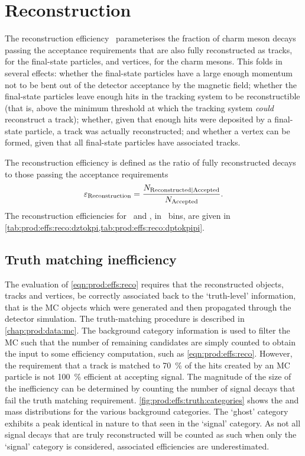 \section{Reconstruction}
\label{chap:prod:effs:reco}

The reconstruction efficiency \effreco\ parameterises the fraction of charm
meson decays passing the acceptance requirements that are also fully
reconstructed as tracks, for the final-state particles, and vertices, for the
charm mesons.
This folds in several effects: whether the final-state particles have a large
enough momentum not to be bent out of the detector acceptance by the magnetic
field; whether the final-state particles leave enough hits in the tracking
system to be reconstructible (that is, above the minimum threshold at which the
tracking system \emph{could} reconstruct a track); whether, given that enough
hits were deposited by a final-state particle, a track was actually
reconstructed; and whether a vertex can be formed, given that all final-state
particles have associated tracks.

The reconstruction efficiency is defined as the ratio of fully reconstructed
decays to those passing the acceptance requirements
\begin{equation}
  \effreco = \frac{%
    N_{\text{Reconstructed}|\text{Accepted}}
  }
  {%
    N_{\text{\text{Accepted}}}
  }.
  \label{eqn:prod:effs:reco}
\end{equation}
The reconstruction efficiencies for \DzToKpi\ and \DpToKpipi, in \pTy\ bins, are
given in \cref{tab:prod:effs:reco:dztokpi,tab:prod:effs:reco:dptokpipi}.

\subsection{Truth matching inefficiency}
\label{chap:prod:effs:truth}

The evaluation of \cref{eqn:prod:effs:reco} requires that the reconstructed
objects, tracks and vertices, be correctly associated back to the `truth-level'
information, that is the \ac{MC} objects which were generated and then
propagated through the detector simulation.
The truth-matching procedure is described in \cref{chap:prod:data:mc}.
The background category information is used to filter the \ac{MC} such that the
number of remaining candidates are simply counted to obtain the input to some
efficiency computation, such as \cref{eqn:prod:effs:reco}.
However, the requirement that a track is matched to \SI{70}{\percent} of the
hits created by an \ac{MC} particle is not \SI{100}{\percent} efficient at
accepting signal.
The magnitude of the size of the inefficiency can be determined by counting the
number of signal decays that fail the truth matching requirement.
\cref{fig:prod:effs:truth:categories} shows the \PDzero and \PDplus mass
distributions for the various background categories.
The `ghost' category exhibits a peak identical in nature to that seen in the
`signal' category.
As not all signal decays that are truly reconstructed will be counted as such
when only the `signal' category is considered, associated efficiencies are
underestimated.

